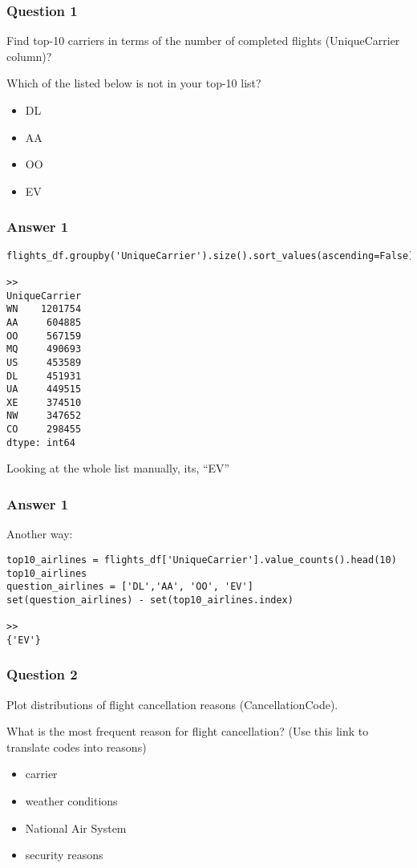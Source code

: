 \begin{frame}[fragile]\frametitle{Question 1}
Find top-10 carriers in terms of the number of completed flights (UniqueCarrier column)?

Which of the listed below is not in your top-10 list?
\begin{itemize}
\item DL
\item AA
\item OO
\item EV
\end{itemize}

\end{frame}

\begin{frame}[fragile]\frametitle{Answer 1}
\begin{lstlisting}
flights_df.groupby('UniqueCarrier').size().sort_values(ascending=False).iloc[:10]

>>
UniqueCarrier
WN    1201754
AA     604885
OO     567159
MQ     490693
US     453589
DL     451931
UA     449515
XE     374510
NW     347652
CO     298455
dtype: int64
\end{lstlisting}
Looking at the whole list manually, its, ``EV''
\end{frame}

\begin{frame}[fragile]\frametitle{Answer 1}
Another way:
\begin{lstlisting}
top10_airlines = flights_df['UniqueCarrier'].value_counts().head(10)
top10_airlines
question_airlines = ['DL','AA', 'OO', 'EV']
set(question_airlines) - set(top10_airlines.index)

>>
{'EV'}
\end{lstlisting}

\end{frame}

\begin{frame}[fragile]\frametitle{Question 2}
Plot distributions of flight cancellation reasons (CancellationCode).

What is the most frequent reason for flight cancellation? (Use this link to translate codes into reasons)
\begin{itemize}
\item carrier
\item weather conditions
\item National Air System
\item security reasons
\end{itemize}

\end{frame}

